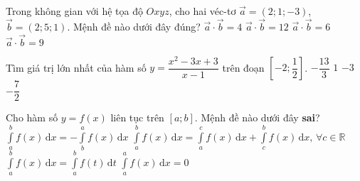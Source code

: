 \begin{ex}%
Trong không gian với hệ tọa độ $Oxyz$, cho hai véc-tơ $\overrightarrow{a}=(2;1;-3)$, $\overrightarrow{b}=(2;5;1)$. Mệnh đề nào dưới đây đúng?
\choice
{$\overrightarrow{a}\cdot\overrightarrow{b}=4$}
{$\overrightarrow{a}\cdot\overrightarrow{b}=12$}
{\True $\overrightarrow{a}\cdot\overrightarrow{b}=6$}
{$\overrightarrow{a}\cdot\overrightarrow{b}=9$}
\end{ex}

\begin{ex}%
Tìm giá trị lớn nhất của hàm số $y=\dfrac{x^2-3x+3}{x-1}$ trên đoạn $\left[-2;\dfrac{1}{2}\right]$.
\choice
{$-\dfrac{13}{3}$}
{$1$}
{\True $-3$}
{$-\dfrac{7}{2}$}
\end{ex}

\begin{ex}%
Cho hàm số $y=f(x)$ liên tục trên $[a;b]$. Mệnh đề nào dưới đây {\bf sai}?
\choice
{$\displaystyle\int\limits_{a}^{b}f(x)\mathrm{\,d}x=-\displaystyle\int\limits_{b}^{a}f(x)\mathrm{\,d}x$}
{\True $\displaystyle\int\limits_{a}^{b}f(x)\mathrm{\,d}x=\displaystyle\int\limits_{a}^{c}f(x)\mathrm{\,d}x+\displaystyle\int\limits_{c}^{b}f(x)\mathrm{\,d}x,\, \forall c\in\mathbb{R}$}
{$\displaystyle\int\limits_{a}^{b}f(x)\mathrm{\,d}x=\displaystyle\int\limits_{a}^{b}f(t)\mathrm{\,d}t$}
{$\displaystyle\int\limits_{a}^{a}f(x)\mathrm{\,d}x=0$}
\end{ex}


